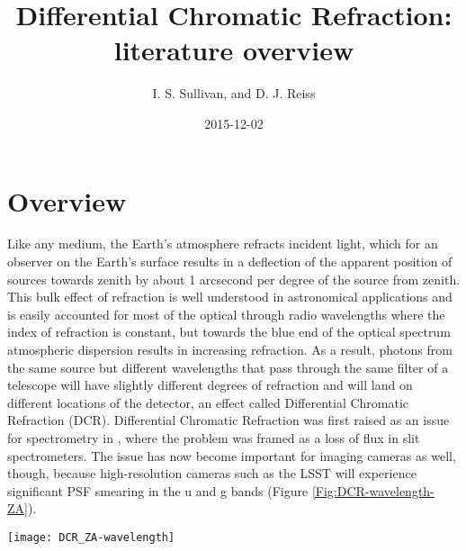 \documentclass[DM,authoryear,toc]{lsstdoc}
\title[DCR Literature Overview]{Differential Chromatic Refraction: literature overview}
\author{I. S. Sullivan, and D. J. Reiss}
\date{2015-12-02}
\begin{document}
\maketitle

\section{Overview}
Like any medium, the Earth's atmosphere refracts incident light, which for an observer on the Earth's surface results in a deflection of the apparent position of sources towards zenith by about 1 arcsecond per degree of the source from zenith. This bulk effect of refraction is well understood in astronomical applications and is easily accounted for most of the optical through radio wavelengths where the index of refraction is constant, but towards the blue end of the optical spectrum atmospheric dispersion results in increasing refraction. As a result, photons from the same source but different wavelengths that pass through the same filter of a telescope will have slightly different degrees of refraction and will land on different locations of the detector, an effect called Differential Chromatic Refraction (DCR). Differential Chromatic Refraction was first raised as an issue for spectrometry in \cite{1982PASP...94..715F}, where the problem was framed as a loss of flux in slit spectrometers. The issue has now become important for imaging cameras as well, though, because high-resolution cameras such as the LSST will experience significant PSF smearing in the u and g bands (Figure  \ref{Fig:DCR-wavelength-ZA}).


\begin{figure*}
	\begin{center}
		\texttt{[image: DCR\_ZA-wavelength]}
		\caption{Maximum DCR over a range of zenith angles and wavelengths. Each wavelength is treated as the center wavelength of a band with bandwidth interpolated between the actual LSST bands (black lines), and maximum DCR is calculated for the difference in position of two photons from the same source at opposite ends of the band.}
		\label{Fig:DCR-wavelength-ZA}
\end{center}
\end{figure*}
\begin{figure*}
	\begin{center}
		\caption{Investigation of maximum DCR under varying conditions for LSST u' band. For a given filter, maximum DCR depends on the zenith angle of observation (airmass), atmospheric pressure, temperature, and, to a lessor degree, humidity. In panels (a) - (c) we keep one of the three main parameters fixed at a nominal value, and map the full range of realistic observing conditions for the remaining two to get a feel for the relative importance of each.}
		\label{Fig:DCR-P-T}
	\end{center}
\end{figure*}
\end{document}
